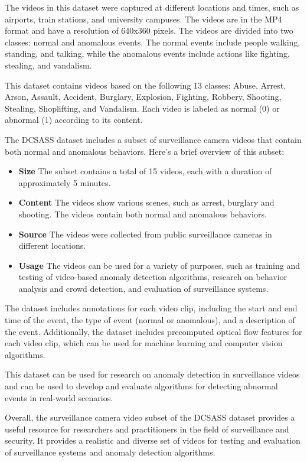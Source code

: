 \documentclass[conference]{IEEEtran}
\begin{document}
The videos in this dataset were captured at different locations and times, such as airports, train stations, and university campuses. The videos are in the MP4 format and have a resolution of 640x360 pixels. The videos are divided into two classes: normal and anomalous events. The normal events include people walking, standing, and talking, while the anomalous events include actions like fighting, stealing, and vandalism.

This dataset contains videos based on the following 13 classes: Abuse, Arrest, Arson, Assault, Accident, Burglary, Explosion, Fighting, Robbery, Shooting, Stealing, Shoplifting, and Vandalism. Each video is labeled as normal (0) or abnormal (1) according to its content.

The DCSASS dataset includes a subset of surveillance camera videos that contain both normal and anomalous behaviors. Here's a brief overview of this subset:

\begin{itemize}

    \item \textbf{Size} The subset contains a total of 15 videos, each with a duration of approximately 5 minutes.
    \item \textbf{Content} The videos show various scenes, such as arrest, burglary and shooting. The videos contain both normal and anomalous behaviors.
    \item \textbf{Source} The videos were collected from public surveillance cameras in different locations.
    \item \textbf{Usage} The videos can be used for a variety of purposes, such as training and testing of video-based anomaly detection algorithms, research on behavior analysis and crowd detection, and evaluation of surveillance systems.

\end{itemize}
	
The dataset includes annotations for each video clip, including the start and end time of the event, the type of event (normal or anomalous), and a description of the event. Additionally, the dataset includes precomputed optical flow features for each video clip, which can be used for machine learning and computer vision algorithms.

This dataset can be used for research on anomaly detection in surveillance videos and can be used to develop and evaluate algorithms for detecting abnormal events in real-world scenarios.

Overall, the surveillance camera video subset of the DCSASS dataset provides a useful resource for researchers and practitioners in the field of surveillance and security. It provides a realistic and diverse set of videos for testing and evaluation of surveillance systems and anomaly detection algorithms.
\end{document}
